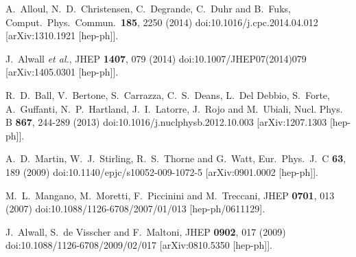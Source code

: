\documentclass{ws-mpla}
\begin{document}
\begin{thebibliography}{99}
  A.~Alloul, N.~D.~Christensen, C.~Degrande, C.~Duhr and B.~Fuks,
  Comput.\ Phys.\ Commun.\  {\bf 185}, 2250 (2014)
  doi:10.1016/j.cpc.2014.04.012
  [arXiv:1310.1921 [hep-ph]].

  J.~Alwall {\it et al.},
  JHEP {\bf 1407}, 079 (2014)
  doi:10.1007/JHEP07(2014)079
  [arXiv:1405.0301 [hep-ph]].

R.~D.~Ball, V.~Bertone, S.~Carrazza, C.~S.~Deans, L.~Del Debbio, S.~Forte, A.~Guffanti, N.~P.~Hartland, J.~I.~Latorre, J.~Rojo and M.~Ubiali,
Nucl. Phys. B \textbf{867}, 244-289 (2013)
doi:10.1016/j.nuclphysb.2012.10.003
[arXiv:1207.1303 [hep-ph]].
    
  A.~D.~Martin, W.~J.~Stirling, R.~S.~Thorne and G.~Watt,
  Eur.\ Phys.\ J.\ C {\bf 63}, 189 (2009)
  doi:10.1140/epjc/s10052-009-1072-5
  [arXiv:0901.0002 [hep-ph]].
  
  M.~L.~Mangano, M.~Moretti, F.~Piccinini and M.~Treccani,
  JHEP {\bf 0701}, 013 (2007)
  doi:10.1088/1126-6708/2007/01/013
  [hep-ph/0611129].

  J.~Alwall, S.~de Visscher and F.~Maltoni,
  JHEP {\bf 0902}, 017 (2009)
  doi:10.1088/1126-6708/2009/02/017
  [arXiv:0810.5350 [hep-ph]].


\end{thebibliography}
\end{document}
